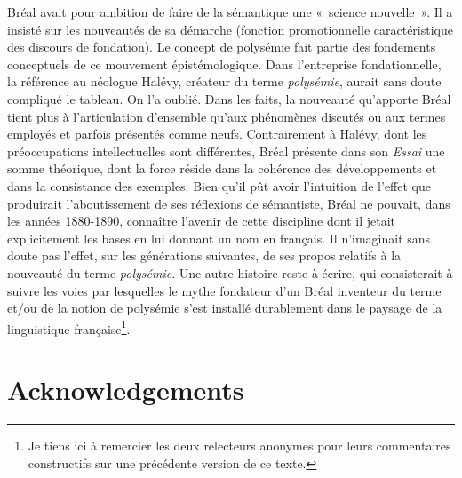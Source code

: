 \documentclass[output=paper]{langsci/langscibook}
\begin{document}
Bréal avait pour ambition de faire de la sémantique une «~science nouvelle~». Il a insisté sur les nouveautés de sa démarche (fonction promotionnelle caractéristique des discours de fondation). Le concept de polysémie fait partie des fondements conceptuels de ce mouvement épistémologique. Dans l’entreprise fondationnelle, la référence au néologue Halévy, créateur du terme \textit{polysémie}, aurait sans doute compliqué le tableau. On l’a oublié. Dans les faits, la nouveauté qu’apporte Bréal tient plus à l’articulation d’ensemble qu’aux phénomènes discutés ou aux termes employés et parfois présentés comme neufs. Contrairement à Halévy, dont les préoccupations intellectuelles sont différentes, Bréal présente dans son \textit{Essai} une somme théorique, dont la force réside dans la cohérence des développements et dans la consistance des exemples. Bien qu’il pût avoir l’intuition de l’effet que produirait l’aboutissement de ses réflexions de sémantiste, Bréal ne pouvait, dans les années 1880-1890, connaître l’avenir de cette discipline dont il jetait explicitement les bases en lui donnant un nom en français. Il n’imaginait sans doute pas l’effet, sur les générations suivantes, de ses propos relatifs à la nouveauté du terme \textit{polysémie}. Une autre histoire reste à écrire, qui consisterait à suivre les voies par lesquelles le mythe fondateur d’un Bréal inventeur du terme et/ou de la notion de polysémie s’est installé durablement dans le paysage de la linguistique française\footnote{ \textrm{Je tiens ici à remercier les deux relecteurs anonymes pour leurs commentaires constructifs sur une précédente version de ce texte.}}.

\section*{Acknowledgements}

{\sloppy\printbibliography[heading=subbibliography,notkeyword=this]}
\end{document}

